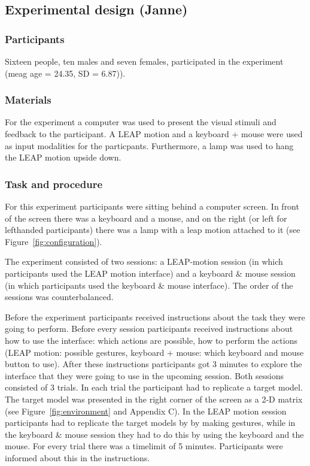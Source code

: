 \subsection{Experimental design (Janne)}
\subsubsection{Participants}
Sixteen people, ten males and seven females, participated in the experiment (meag age = 24.35, SD = 6.87)). 
\subsubsection{Materials}
For the experiment a computer was used to present the visual stimuli and feedback to the participant. A LEAP motion and a keyboard + mouse were used as input modalities for the particpants. Furthermore, a lamp was used to hang the LEAP motion upside down.
\subsubsection{Task and procedure}
For this experiment participants were sitting behind a computer screen. In front of the screen there was a keyboard and a mouse, and on the right (or left for lefthanded participants) there was a lamp with a leap motion attached to it (see Figure~\ref{fig:configuration}).

The experiment consisted of two sessions: a LEAP-motion session (in which participants used the LEAP motion interface) and a keyboard \& mouse session (in which participants used the keyboard \& mouse interface). The order of the sessions was counterbalanced.

Before the experiment participants received instructions about the task they were going to perform. Before every session participants received instructions about how to use the interface: which actions are possible, how to perform the actions (LEAP motion: possible gestures, keyboard + mouse: which keyboard and mouse button to use). After these instructions participants got 3 minutes to explore the interface that they were going to use in the upcoming session. 
Both sessions consisted of 3 trials. In each trial the participant had to replicate a target model. The target model was presented in the right corner of the screen as a 2-D matrix (see Figure~\ref{fig:environment} and Appendix C). In the LEAP motion session participants had to replicate the target models by by making gestures, while in the keyboard \& mouse session they had to do this by using the keyboard and the mouse. For every trial there was a timelimit of 5 minutes. Participants were informed about this in the instructions.

